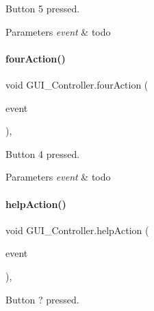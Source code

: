 Button \textquotesingle{}5\textquotesingle{} pressed. 


\begin{DoxyParams}{Parameters}
{\em event} & todo \\
\hline
\end{DoxyParams}
\mbox{\label{classGUI__Controller_a98a563cfbb9c2a951ee786d576a2329c}} 
\paragraph{\texorpdfstring{four\+Action()}{fourAction()}}
{\footnotesize\ttfamily void G\+U\+I\+\_\+\+Controller.\+four\+Action (\begin{DoxyParamCaption}\item[{Action\+Event}]{event }\end{DoxyParamCaption})\hspace{0.3cm}{\ttfamily [inline]}, {\ttfamily [private]}}



Button \textquotesingle{}4\textquotesingle{} pressed. 


\begin{DoxyParams}{Parameters}
{\em event} & todo \\
\hline
\end{DoxyParams}
\mbox{\label{classGUI__Controller_aeaa83c7bf60a12582636385571d1241a}} 
\paragraph{\texorpdfstring{help\+Action()}{helpAction()}}
{\footnotesize\ttfamily void G\+U\+I\+\_\+\+Controller.\+help\+Action (\begin{DoxyParamCaption}\item[{Action\+Event}]{event }\end{DoxyParamCaption})\hspace{0.3cm}{\ttfamily [inline]}, {\ttfamily [private]}}



Button \textquotesingle{}?\textquotesingle{} pressed. 


